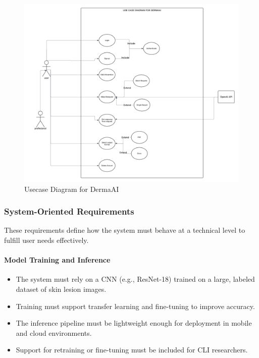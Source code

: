 \documentclass[
  12pt,
  oneside]{article}
\providecommand{\tightlist}{%
  \setlength{\itemsep}{0pt}\setlength{\parskip}{0pt}}
\begin{document}
\newpage

\begin{figure}

{\centering \includegraphics[width=1\linewidth]{DermaAI-Usecase} 

}

\caption{Usecase Diagram for DermaAI}\label{fig:unnamed-chunk-15}
\end{figure}

\subsubsection{System-Oriented
Requirements}\label{system-oriented-requirements}

These requirements define how the system must behave at a technical
level to fulfill user needs effectively.

\paragraph{Model Training and
Inference}\label{model-training-and-inference}

\begin{itemize}
\tightlist
\item
  The system must rely on a CNN (e.g., ResNet-18) trained on a large,
  labeled dataset of skin lesion images.\\
\item
  Training must support transfer learning and fine-tuning to improve
  accuracy.\\
\item
  The inference pipeline must be lightweight enough for deployment in
  mobile and cloud environments.\\
\item
  Support for retraining or fine-tuning must be included for CLI
  researchers.
\end{itemize}
\end{document}

